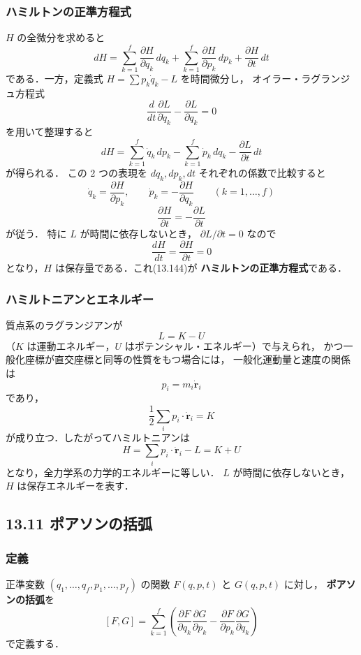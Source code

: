 \documentclass[a4paper,12pt]{jlreq}
\begin{document}
\subsubsection{ハミルトンの正準方程式}
$H$ の全微分を求めると
\[
  dH = \sum_{k=1}^f
       \frac{\partial H}{\partial q_k}\,dq_k
     + \sum_{k=1}^f
       \frac{\partial H}{\partial p_k}\,dp_k
     + \frac{\partial H}{\partial t}\,dt
\tag{13.139}
\]
である．一方，定義式 $H=\sum p_k\dot q_k - L$ を時間微分し，
オイラー・ラグランジュ方程式
\[
  \frac{d}{dt}
  \frac{\partial L}{\partial \dot q_k}
  - \frac{\partial L}{\partial q_k} = 0
\tag{13.103}
\]
を用いて整理すると
\[
  dH = \sum_{k=1}^f \dot q_k\,dp_k
      - \sum_{k=1}^f \dot p_k\,dq_k
      - \frac{\partial L}{\partial t}\,dt
\tag{13.143}
\]
が得られる．
この 2 つの表現を $dq_k,dp_k,dt$ それぞれの係数で比較すると
\[
  \dot q_k = \frac{\partial H}{\partial p_k},\qquad
  \dot p_k = -\frac{\partial H}{\partial q_k}
  \qquad (k=1,\dots,f)
\tag{13.144}
\]
\[
  \frac{\partial H}{\partial t}
  = -\frac{\partial L}{\partial t}
\tag{13.140}
\]
が従う．
特に $L$ が時間に依存しないとき，
$\partial L/\partial t=0$ なので
\[
  \frac{dH}{dt} = \frac{\partial H}{\partial t} = 0
\]
となり，$H$ は保存量である．これ(13.144)が
\textbf{ハミルトンの正準方程式}である．

\subsubsection{ハミルトニアンとエネルギー}
質点系のラグランジアンが
\[
  L = K - U
\]
（$K$ は運動エネルギー，$U$ はポテンシャル・エネルギー）で与えられ，
かつ一般化座標が直交座標と同等の性質をもつ場合には，
一般化運動量と速度の関係は
\[
  p_i = m_i \dot{\bm r}_i
\tag{13.145}
\]
であり，
\[
  \frac{1}{2}\sum_i p_i\cdot\dot{\bm r}_i = K
\tag{13.150}
\]
が成り立つ．したがってハミルトニアンは
\[
  H = \sum_i p_i\cdot\dot{\bm r}_i - L
    = K + U
\tag{13.152}
\]
となり，全力学系の力学的エネルギーに等しい．
$L$ が時間に依存しないとき，$H$ は保存エネルギーを表す．

\subsection*{13.11 ポアソンの括弧}

\subsubsection{定義}
正準変数 $(q_1,\dots,q_f,p_1,\dots,p_f)$ の関数
$F(q,p,t)$ と $G(q,p,t)$ に対し，
\textbf{ポアソンの括弧}を
\[
  [F,G]
  = \sum_{k=1}^f
    \left(
      \frac{\partial F}{\partial q_k}
      \frac{\partial G}{\partial p_k}
      - 
      \frac{\partial F}{\partial p_k}
      \frac{\partial G}{\partial q_k}
    \right)
\tag{13.155}
\]
で定義する．
\end{document}
